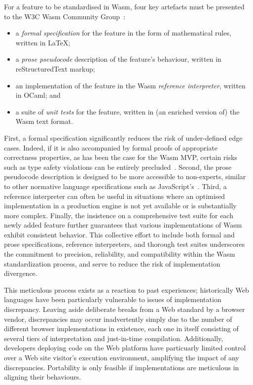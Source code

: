 For a feature to be standardised in Wasm, four key artefacts must be presented
to the W3C Wasm Community Group~\cite{wasm-w3c}:
\begin{itemize}
\item a \emph{formal specification} for the feature in the form of mathematical rules, written in LaTeX;
\item a \emph{prose pseudocode} description of the feature's behaviour, written in reStructuredText markup;
\item an implementation of the feature in the Wasm \emph{reference interpreter}, written in OCaml; and
\item a suite of \emph{unit tests} for the feature, written in (an enriched version of) the Wasm text format.
\end{itemize}
First, a formal specification significantly reduces the risk of under-defined edge cases. Indeed, if it is also accompanied by formal proofs of
appropriate correctness properties, as has been the case for the Wasm MVP,
certain risks such as type safety violations can be entirely precluded~\cite{Watt2018MechanisingAV, Watt2021Two}.
Second, the prose pseudocode description is designed to be more accessible to
non-experts, similar to other normative language specifications such as JavaScript's~\cite{ecmascript}.
Third, a reference interpreter can often be useful in situations where an optimised
implementation in a production engine is not yet available or is substantially
more complex.  Finally, the insistence on a comprehensive test suite for each
newly added feature further guarantees that various implementations of Wasm
exhibit consistent behavior.  This collective effort to include both
formal and prose specifications,
reference interpreters, and thorough test suites underscores the commitment to
precision, reliability, and compatibility within the Wasm standardization
process, and serve to reduce the risk of implementation divergence.

This meticulous process exists as a reaction to past experiences; historically Web languages have been particularly vulnerable to
issues of implementation discrepancy.  Leaving aside deliberate breaks from a Web standard by a browser vendor,
discrepancies may occur inadvertently simply due to the number of different browser implementations in existence, each one in itself consisting of several tiers of interpretation and just-in-time compilation.  Additionally, developers deploying code on the Web platform
have particuarly limited control over a Web site visitor's execution environment, amplifying the impact of
any discrepancies.  Portability is only feasible if implementations are meticulous in aligning their behaviours.

